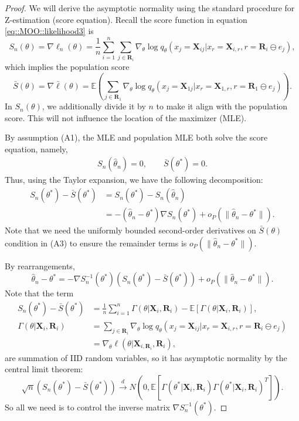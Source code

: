 \documentclass[aos, preprint]{imsart}
\theoremstyle{plain}
\theoremstyle{definition}
\let\hat\widehat
\newcommand{\E}{\mbox{$\mathbb{E}$}}
\newcommand{\bX}{\mathbf{X}}
\newcommand{\bR}{\mathbf{R}}
\begin{document}
\begin{appendix}
\begin{proof}

We will derive the asymptotic normality using the standard procedure for Z-estimation (score equation). 
Recall the score function in equation \eqref{eq::MOO::likelihood3} is
\begin{equation*}
S_n(\theta) = \nabla\ell_n(\theta)   = \frac{1}{n}\sum_{i=1}^n\sum_{j \in \bR_i} \nabla_\theta \log q_\theta(x_j = \bX_{ij}|x_{r} = \bX_{i, r}, r = \bR_i\ominus e_j),
\end{equation*}
which implies the population score 
$$
\bar S(\theta) = \nabla \bar \ell(\theta) = \E\left(\sum_{j \in \bR_1} \nabla_\theta \log q_\theta(x_j = \bX_{1j}|x_{r} = \bX_{1, r}, r = \bR_1\ominus e_j) \right).
$$
In $S_n(\theta)$, we additionally divide it by $n$
to make it align with the population score. 
This will not influence the location of the maximizer (MLE).

By assumption (A1), the MLE and population MLE both solve the score equation, namely,
\begin{align*}
S_n(\hat\theta_n) = 0 ,\qquad \bar S(\theta^*) = 0.
\end{align*}
Thus, using the Taylor expansion, we have the following decomposition:
\begin{align*}
S_n(\theta^*) - \bar S(\theta^*) & = S_n(\theta^*) - S_n(\hat \theta_n)\\
& = - (\hat \theta_n - \theta^*) \nabla S_n(\theta^*) + o_P(\|\hat \theta_n - \theta^*\|).
\end{align*}
Note that we need the uniformly bounded  second-order derivatives on $\bar S(\theta)$
condition in (A3) to ensure the remainder terms is $o_P(\|\hat \theta_n - \theta^*\|)$.

By rearrangements, 
$$
\hat \theta_n - \theta^* = -  \nabla S^{-1}_n(\theta^*) (S_n(\theta^*) - \bar S(\theta^*)) + o_P(\|\hat \theta_n - \theta^*\|). 
$$
Note that the term 
\begin{equation}
\begin{aligned}
S_n(\theta^*) - \bar S(\theta^*)  &= \frac{1}{n}\sum_{i=1}^n \Gamma(\theta| \bX_i, \bR_i) - \E[\Gamma(\theta| \bX_i, \bR_i)],\\
  \Gamma(\theta| \bX_i, \bR_i) &= \sum_{j \in \bR_i} \nabla_\theta \log q_\theta(x_j = \bX_{ij}|x_{r} = \bX_{i, r}, r = \bR_i\ominus e_j)\\
  & = \nabla_\theta  \ell(\theta|\bX_{i,\bR_i},\bR_i),
\end{aligned}
\label{eq::MLE::G}
\end{equation}
are summation of IID random variables, so it has asymptotic normality by the central limit theorem:
\begin{equation}
\sqrt{n}(S_n(\theta^*) - \bar S(\theta^*)) \overset{d}{\rightarrow}N (0, \E\left[\Gamma(\theta^*| \bX_i, \bR_i) \Gamma(\theta^*| \bX_i, \bR_i)^T \right ]). 
\label{eq::MLE::N}
\end{equation}
So all we need is to control the inverse matrix $ \nabla S^{-1}_n(\theta^*)$. 



\end{proof}
\end{appendix}
\end{document}
